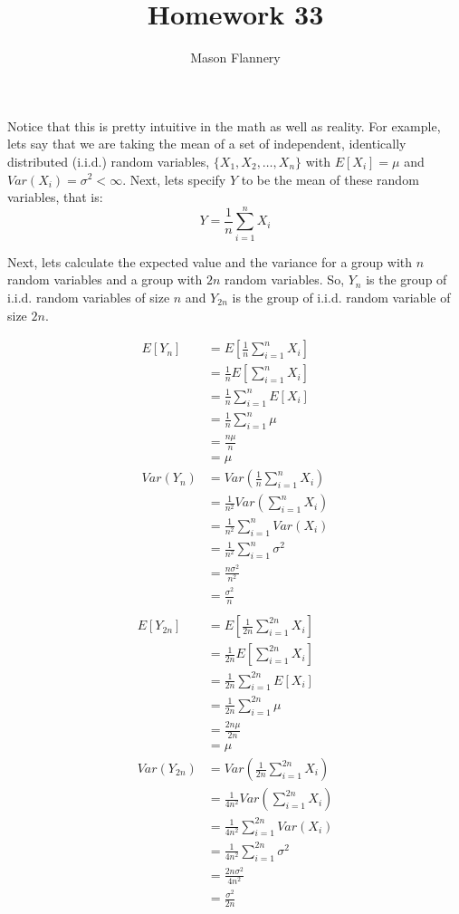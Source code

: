\documentclass{article}
\title{Homework 33}
\author{Mason Flannery}
\begin{document}
\maketitle
Notice that this is pretty intuitive in the math as well as reality. For example, lets say that we are taking the mean of a set of independent, identically distributed (i.i.d.) random variables, $\{X_{1},X_{2},\dots,X_{n}\}$ with $E[X_{i}]=\mu$ and $Var(X_{i})=\sigma^{2}<\infty$. Next, lets specify $Y$ to be the mean of these random variables, that is: $$Y=\frac1n\sum_{i=1}^{n}X_{i}$$

Next, lets calculate the expected value and the variance for a group with $n$ random variables and a group with $2n$ random variables. So, $Y_{n}$ is the group of i.i.d. random variables of size $n$ and $Y_{2n}$ is the group of i.i.d. random variable of size $2n$.
\begin{multicols}{2}
\begin{align*}
    E[Y_{n}]&=E\left[\frac1n\sum_{i=1}^{n}X_{i}\right]\\
    &=\frac1n E\left[\sum_{i=1}^{n}X_{i}\right]\\
    &=\frac1n\sum_{i=1}^{n}E[X_{i}]\\
    &=\frac1n\sum_{i=1}^{n}\mu\\
    &=\frac{n\mu}{n}\\
    &=\mu\\
    Var(Y_{n})&=Var\left(\frac1n\sum_{i=1}^{n}X_{i}\right)\\
    &=\frac{1}{n^{2}}Var\left(\sum_{i=1}^{n}X_{i}\right)\\
    &=\frac{1}{n^{2}}\sum^{n}_{i=1}Var(X_{i})\\
    &=\frac{1}{n^{2}}\sum^{n}_{i=1}\sigma^{2}\\
    &=\frac{n\sigma^{2}}{n^{2}}\\
    &=\frac{\sigma^{2}}{n}
\end{align*}
\columnbreak
\begin{align*}
 \\
    E[Y_{2n}]&=E\left[\frac1{2n}\sum_{i=1}^{2n}X_{i}\right]\\
    &=\frac1{2n} E\left[\sum_{i=1}^{2n}X_{i}\right]\\
    &=\frac1{2n}\sum_{i=1}^{2n}E[X_{i}]\\
    &=\frac1{2n}\sum_{i=1}^{2n}\mu\\
    &=\frac{2n\mu}{2n}\\
    &=\mu\\
Var(Y_{2n})&=Var\left(\frac{1}{2n}\sum_{i=1}^{2n}X_{i}\right)\\
    &=\frac{1}{4n^{2}}Var\left(\sum_{i=1}^{2n}X_{i}\right)\\
    &=\frac{1}{4n^{2}}\sum^{2n}_{i=1}Var(X_{i})\\
    &=\frac{1}{4n^{2}}\sum^{2n}_{i=1}\sigma^{2}\\
    &=\frac{2n\sigma^{2}}{4n^{2}}\\
    &=\frac{\sigma^{2}}{2n}
\end{align*}
\end{multicols}
\end{document}
